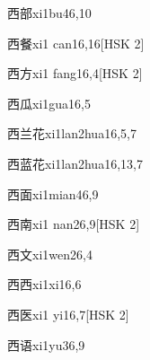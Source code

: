 \begin{entry}{西部}{xi1bu4}{6,10}
\end{entry}

\begin{entry}{西餐}{xi1 can1}{6,16}[HSK 2]
\end{entry}

\begin{entry}{西方}{xi1 fang1}{6,4}[HSK 2]
\end{entry}

\begin{entry}{西瓜}{xi1gua1}{6,5}
\end{entry}

\begin{entry}{西兰花}{xi1lan2hua1}{6,5,7}
\end{entry}

\begin{entry}{西蓝花}{xi1lan2hua1}{6,13,7}
\end{entry}

\begin{entry}{西面}{xi1mian4}{6,9}
\end{entry}

\begin{entry}{西南}{xi1 nan2}{6,9}[HSK 2]
\end{entry}

\begin{entry}{西文}{xi1wen2}{6,4}
\end{entry}

\begin{entry}{西西}{xi1xi1}{6,6}
\end{entry}

\begin{entry}{西医}{xi1 yi1}{6,7}[HSK 2]
\end{entry}

\begin{entry}{西语}{xi1yu3}{6,9}
\end{entry}

